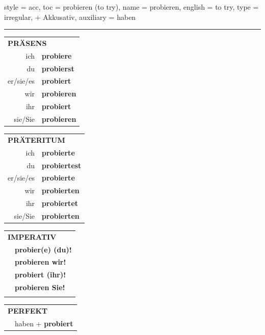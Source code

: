 \begin{verbentry}{
  style = {acc},
  toc = {probieren (to try)},
  name = {probieren},
  english = {to try},
  type = {irregular, + Akkusativ},
  auxiliary = {haben}
}
 
    
     \vspace{5pt}

    \hrule
    
    \vspace{5pt}

  \begin{tabular}{rl}
     \multicolumn{2}{l}{\textbf{PRÄSENS} }\\
    ich & \textbf{probiere}\\
    du & \textbf{probierst}\\
    er/sie/es & \textbf{probiert}\\
    wir & \textbf{probieren}\\
    ihr & \textbf{probiert}\\
    sie/Sie & \textbf{probieren}\\
  \end{tabular}
  \hfill
     \begin{tabular}{rl}
    \multicolumn{2}{l}{\textbf{PRÄTERITUM} }\\
    ich & \textbf{probierte}\\
    du & \textbf{probiertest}\\
    er/sie/es & \textbf{probierte}\\
    wir & \textbf{probierten}\\
    ihr & \textbf{probiertet}\\
    sie/Sie & \textbf{probierten}\\
  \end{tabular}
  \hfill
  \begin{tabular}{rl}
     \multicolumn{2}{l}{\textbf{IMPERATIV} }\\
   & \textbf{probier(e) (du)!}\\
   & \textbf{probieren wir!}\\
   & \textbf{probiert (ihr)!}\\
   & \textbf{probieren Sie!}\\
   & \vspace{10pt}
  \end{tabular}

    \vspace{10pt}

 \begin{tabular}{rl}
     \multicolumn{2}{l}{\textbf{PERFEKT}}\\
   & haben + \textbf{probiert}\\
  \end{tabular}
\hfill
   \begin{tabular}{rl}
   

\end{tabular}
\end{verbentry}
